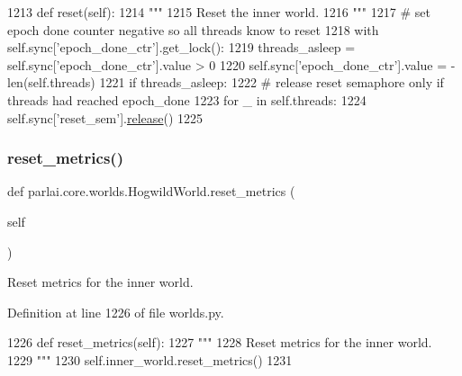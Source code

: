 \begin{DoxyCode}
1213     \textcolor{keyword}{def }reset(self):
1214         \textcolor{stringliteral}{"""}
1215 \textcolor{stringliteral}{        Reset the inner world.}
1216 \textcolor{stringliteral}{        """}
1217         \textcolor{comment}{# set epoch done counter negative so all threads know to reset}
1218         with self.sync[\textcolor{stringliteral}{'epoch\_done\_ctr'}].get\_lock():
1219             threads\_asleep = self.sync[\textcolor{stringliteral}{'epoch\_done\_ctr'}].value > 0
1220             self.sync[\textcolor{stringliteral}{'epoch\_done\_ctr'}].value = -len(self.threads)
1221         \textcolor{keywordflow}{if} threads\_asleep:
1222             \textcolor{comment}{# release reset semaphore only if threads had reached epoch\_done}
1223             \textcolor{keywordflow}{for} \_ \textcolor{keywordflow}{in} self.threads:
1224                 self.sync[\textcolor{stringliteral}{'reset\_sem'}].\hyperlink{namespaceconf_a325dc746d8bf05c54d26351c35a21d90}{release}()
1225 
\end{DoxyCode}
\mbox{\label{classparlai_1_1core_1_1worlds_1_1HogwildWorld_ae57e2b90771c0feaa0496cb2885eae6d}} 
\subsubsection{\texorpdfstring{reset\+\_\+metrics()}{reset\_metrics()}}
{\footnotesize\ttfamily def parlai.\+core.\+worlds.\+Hogwild\+World.\+reset\+\_\+metrics (\begin{DoxyParamCaption}\item[{}]{self }\end{DoxyParamCaption})}

\begin{DoxyVerb}Reset metrics for the inner world.
\end{DoxyVerb}
 

Definition at line 1226 of file worlds.\+py.


\begin{DoxyCode}
1226     \textcolor{keyword}{def }reset\_metrics(self):
1227         \textcolor{stringliteral}{"""}
1228 \textcolor{stringliteral}{        Reset metrics for the inner world.}
1229 \textcolor{stringliteral}{        """}
1230         self.inner\_world.reset\_metrics()
1231 
\end{DoxyCode}
\mbox{\label{classparlai_1_1core_1_1worlds_1_1HogwildWorld_a1f7e4c566078aebdb5e837c6fed62b17}} 
